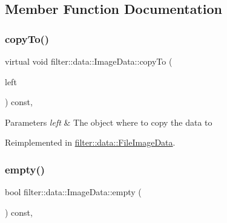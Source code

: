 \subsection{Member Function Documentation}
\mbox{\label{classfilter_1_1data_1_1_image_data_ab035bfe80f8f6a6470046eb15fad7dfb}} 
\subsubsection{\texorpdfstring{copy\+To()}{copyTo()}}
{\footnotesize\ttfamily virtual void filter\+::data\+::\+Image\+Data\+::copy\+To (\begin{DoxyParamCaption}\item[{\hyperlink{classfilter_1_1data_1_1_image_data}{Image\+Data} \&}]{left }\end{DoxyParamCaption}) const\hspace{0.3cm}{\ttfamily [inline]}, {\ttfamily [virtual]}}


\begin{DoxyParams}{Parameters}
{\em left} & The object where to copy the data to \\
\hline
\end{DoxyParams}


Reimplemented in \hyperlink{classfilter_1_1data_1_1_file_image_data_a188f2f5ab66877f6ba553cc847cd5f07}{filter\+::data\+::\+File\+Image\+Data}.

\mbox{\label{classfilter_1_1data_1_1_image_data_aa2aa6922b9cad5746a16a66e15665717}} 
\subsubsection{\texorpdfstring{empty()}{empty()}}
{\footnotesize\ttfamily bool filter\+::data\+::\+Image\+Data\+::empty (\begin{DoxyParamCaption}{ }\end{DoxyParamCaption}) const\hspace{0.3cm}{\ttfamily [inline]}, {\ttfamily [virtual]}}

